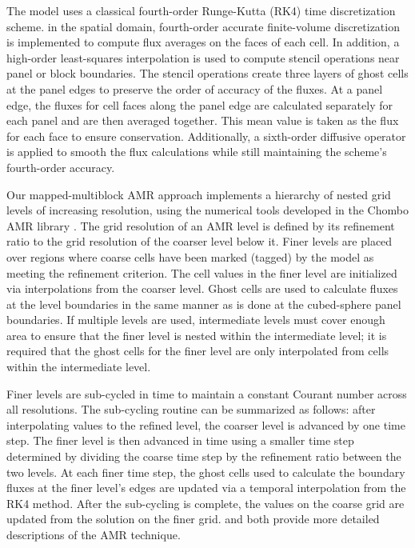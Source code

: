   The model uses a classical fourth-order Runge-Kutta (RK4) 
  time discretization scheme. in the spatial domain, fourth-order 
  accurate finite-volume discretization is implemented to compute 
  flux averages on the faces of each cell. In addition, a high-order 
  least-squares interpolation is used to compute stencil operations near panel 
  or block boundaries. The stencil operations create three layers of ghost cells 
  at the panel edges to preserve the order of accuracy of the fluxes. 
  At a panel edge, the fluxes for cell faces along the panel edge are calculated 
  separately for each panel and are then averaged together. This mean value 
  is taken as the flux for each face to ensure conservation. Additionally, a sixth-order 
  diffusive operator is applied to smooth the flux calculations while still 
  maintaining the scheme's fourth-order accuracy. 
  
  Our mapped-multiblock AMR approach implements a hierarchy of 
  nested grid levels of increasing resolution, using the numerical tools 
  developed in the Chombo AMR library \citep{Adams:2015gd}. 
  The grid resolution of an AMR level is defined by its refinement ratio 
  to the grid resolution of the coarser level below it. Finer levels are 
  placed over regions where coarse cells have been marked (tagged) 
  by the model as meeting the refinement criterion. The cell values in 
  the finer level are initialized via interpolations from the coarser level. 
  Ghost cells are used to calculate fluxes at the level boundaries in the 
  same manner as is done at the cubed-sphere panel boundaries. If 
  multiple levels are used, intermediate levels must cover enough area 
  to ensure that the finer level is nested within the intermediate level; it 
  is required that the ghost cells for the finer level are only interpolated 
  from cells within the intermediate level.  
  
  Finer levels are sub-cycled in time to maintain a constant Courant 
  number across all resolutions. The sub-cycling routine can be 
  summarized as follows: after interpolating values to the refined 
  level, the coarser level is advanced by one time step. The finer level 
  is then advanced in time using a smaller time step determined by 
  dividing the coarse time step by the refinement ratio between the two 
  levels.  At each finer time step, the ghost cells used to calculate the 
  boundary fluxes at the finer level's edges are updated via a temporal 
  interpolation from the RK4 method. After the sub-cycling is complete, 
  the values on the coarse grid are updated from the solution on the 
  finer grid.  \cite{mccorquodale2015adaptive} and \cite{ferguson2016analyzing} 
  both provide more detailed descriptions of the AMR technique. 
  
